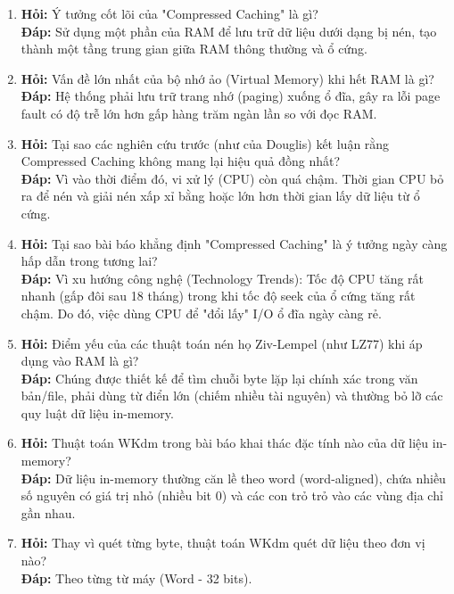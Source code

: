 \documentclass[12pt,a4paper]{article}
\begin{document}
\begin{enumerate}
    \item \textbf{Hỏi:} Ý tưởng cốt lõi của "Compressed Caching" là gì? \\
    \textbf{Đáp:} Sử dụng một phần của RAM để lưu trữ dữ liệu dưới dạng bị nén, tạo thành một tầng trung gian giữa RAM thông thường và ổ cứng.
    
    \item \textbf{Hỏi:} Vấn đề lớn nhất của bộ nhớ ảo (Virtual Memory) khi hết RAM là gì? \\
    \textbf{Đáp:} Hệ thống phải lưu trữ trang nhớ (paging) xuống ổ đĩa, gây ra lỗi page fault có độ trễ lớn hơn gấp hàng trăm ngàn lần so với đọc RAM.
    
    \item \textbf{Hỏi:} Tại sao các nghiên cứu trước (như của Douglis) kết luận rằng Compressed Caching không mang lại hiệu quả đồng nhất? \\
    \textbf{Đáp:} Vì vào thời điểm đó, vi xử lý (CPU) còn quá chậm. Thời gian CPU bỏ ra để nén và giải nén xấp xỉ bằng hoặc lớn hơn thời gian lấy dữ liệu từ ổ cứng.
    
    \item \textbf{Hỏi:} Tại sao bài báo khẳng định "Compressed Caching" là ý tưởng ngày càng hấp dẫn trong tương lai? \\
    \textbf{Đáp:} Vì xu hướng công nghệ (Technology Trends): Tốc độ CPU tăng rất nhanh (gấp đôi sau 18 tháng) trong khi tốc độ seek của ổ cứng tăng rất chậm. Do đó, việc dùng CPU để "đổi lấy" I/O ổ đĩa ngày càng rẻ.
    
    \item \textbf{Hỏi:} Điểm yếu của các thuật toán nén họ Ziv-Lempel (như LZ77) khi áp dụng vào RAM là gì? \\
    \textbf{Đáp:} Chúng được thiết kế để tìm chuỗi byte lặp lại chính xác trong văn bản/file, phải dùng từ điển lớn (chiếm nhiều tài nguyên) và thường bỏ lỡ các quy luật dữ liệu in-memory.
    
    \item \textbf{Hỏi:} Thuật toán WKdm trong bài báo khai thác đặc tính nào của dữ liệu in-memory? \\
    \textbf{Đáp:} Dữ liệu in-memory thường căn lề theo word (word-aligned), chứa nhiều số nguyên có giá trị nhỏ (nhiều bit 0) và các con trỏ trỏ vào các vùng địa chỉ gần nhau.
    
    \item \textbf{Hỏi:} Thay vì quét từng byte, thuật toán WKdm quét dữ liệu theo đơn vị nào? \\
    \textbf{Đáp:} Theo từng từ máy (Word - 32 bits).
    

\end{enumerate}
\end{document}
